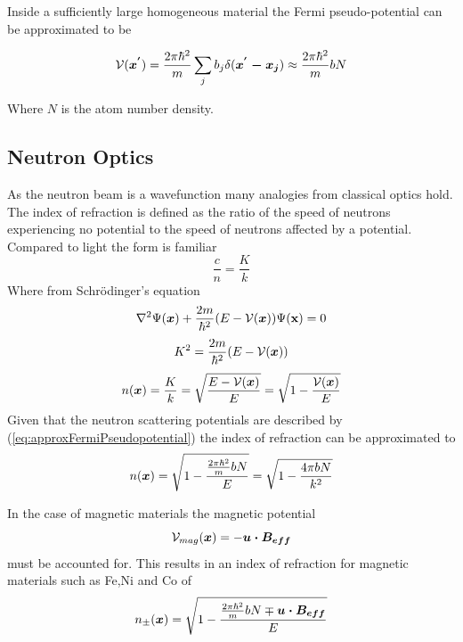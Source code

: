 Inside a sufficiently large homogeneous material the Fermi pseudo-potential can be approximated to be 

\begin{equation}
 \mathcal{V}(\mbox{\boldmath$x^{'}$})  = \frac{2\pi\hbar^2}{m}\sum\limits_{j} b_j \delta(\mbox{\boldmath$x^{'}-x_{j}$}) \approx \frac{2\pi\hbar^2}{m}bN 
\label{eq:approxFermiPseudopotential}
\end{equation}

Where $N$ is the atom number density. 
\subsection{Neutron Optics}
As the neutron beam is a wavefunction many analogies from classical optics hold. The index of refraction is defined as the ratio of the speed of neutrons experiencing no potential to the speed of neutrons affected by a potential. Compared to light the form is familiar 
$$ \frac{c}{n} = \frac{K}{k}$$
Where from Schrödinger's equation
$$\nabla^2\Psi(\mbox{\boldmath$x$}) + \frac{2m}{\hbar^2}(E-\mathcal{V}(\mbox{\boldmath$x$}))\Psi(\mathbf{x}) = 0 $$ 
\begin{equation}
\label{eq:K}
K^2 = \frac{2m}{\hbar^2}(E-\mathcal{V}(\mbox{\boldmath$x$}))
\end{equation}
\begin{equation}
\label{eq:NinPotential}
n(\mbox{\boldmath$x$}) = \frac{K}{k} = \sqrt{\frac{E-\mathcal{V}(\mbox{\boldmath$x$})}{E}}=\sqrt{1-\frac{\mathcal{V}(\mbox{\boldmath$x$})}{E}}
\end{equation}
Given that the neutron scattering potentials are described by (\ref{eq:approxFermiPseudopotential}) the index of refraction can be approximated to \cite{waveguide}
\begin{equation}
n(\mbox{\boldmath$x$}) = \sqrt{1-\frac{\frac{2\pi\hbar^2}{m}bN}{E}}= \sqrt{1 - \frac{4\pi bN}{k^2}}
\label{eq:indexofrefraction}
\end{equation}

In the case of magnetic materials the magnetic potential
\begin{equation*}
\mathcal{V}_{mag}(\mbox{\boldmath$x$})=-\mbox{\boldmath$u \cdot B_{eff}$}
\end{equation*}
 must be accounted for. This results in an index of refraction for magnetic materials such as Fe,Ni and Co of 
\begin{equation}
n_{\pm}(\mbox{\boldmath$x$})= \sqrt{1-\frac{\frac{2\pi\hbar^2}{m}bN \mp \mbox{\boldmath$u \cdot B_{eff}$}}{E}}
\label{eq:nucleurIndexofRefraction}
\end{equation}
